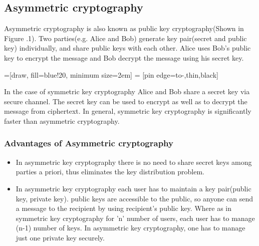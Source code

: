 \documentclass{article}
\begin{document}
	
	\subsection{Asymmetric cryptography }
	Asymmetric cryptography is also known as public key cryptography(Shown in Figure .1). Two parties(e.g. Alice and Bob) generate key pair(secret and public key) individually, and share public keys with each other. Alice uses Bob's public key to encrypt the message and Bob decrypt the message using his secret key.
	
	
\pagestyle{empty}
%
=[draw, fill=blue!20, minimum size=2em]
 = [pin edge={to-,thin,black}]

	
	In the case of symmetric key cryptography Alice and Bob share a secret key via secure channel. The secret key can be used to encrypt as well as to decrypt the message from ciphertext. In general, symmetric key cryptography is significantly faster than asymmetric cryptography. 
	\subsubsection{Advantages of Asymmetric cryptography }
	\begin{itemize}
		\item In asymmetric key cryptography there is no need to share secret keys among parties a priori, thus eliminates the key distribution problem.
		\item In asymmetric key cryptography each user has to maintain a key pair(public key, private key). public keys are accessible to the public, so anyone can send a message to the recipient by using recipient's public key. Where as in symmetric key cryptography for 'n' number of users, each user has to manage (n-1) number of keys. In asymmetric key cryptography, one has to manage just one private key securely. 
		
		
	\end{itemize}
	
\end{document}
